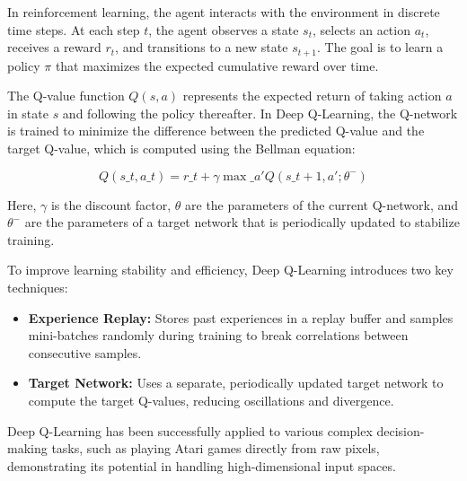 \documentclass[12pt]{report}
\begin{document}
In reinforcement learning, the agent interacts with the environment in discrete time steps. At each step $t$, the agent observes a state $s_t$, selects an action $a_t$, receives a reward $r_t$, and transitions to a new state $s_{t+1}$. The goal is to learn a policy $\pi$ that maximizes the expected cumulative reward over time.

The Q-value function $Q(s, a)$ represents the expected return of taking action $a$ in state $s$ and following the policy thereafter. In Deep Q-Learning, the Q-network is trained to minimize the difference between the predicted Q-value and the target Q-value, which is computed using the Bellman equation:

\begin{equation}
Q(s\_t, a\_t) = r\_t + \gamma \max\_{a'} Q(s\_{t+1}, a'; \theta^-)
\end{equation}

Here, $\gamma$ is the discount factor, $\theta$ are the parameters of the current Q-network, and $\theta^-$ are the parameters of a target network that is periodically updated to stabilize training.

To improve learning stability and efficiency, Deep Q-Learning introduces two key techniques:
\begin{itemize}
\item \textbf{Experience Replay:} Stores past experiences in a replay buffer and samples mini-batches randomly during training to break correlations between consecutive samples.
\item \textbf{Target Network:} Uses a separate, periodically updated target network to compute the target Q-values, reducing oscillations and divergence.
\end{itemize}

Deep Q-Learning has been successfully applied to various complex decision-making tasks, such as playing Atari games directly from raw pixels, demonstrating its potential in handling high-dimensional input spaces.




\end{document}
